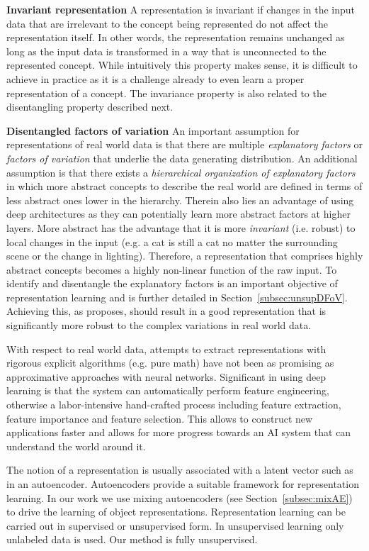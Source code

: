 \documentclass[12pt,a4paper]{article}
\begin{document}
\textbf{Invariant representation}
A representation is invariant if changes in the input data that are irrelevant to the concept being represented do not affect the representation itself. In other words, the representation remains unchanged as long as the input data is transformed in a way that is unconnected to the represented concept. While intuitively this property makes sense, it is difficult to achieve in practice as it is a challenge already to even learn a proper representation of a concept. The invariance property is also related to the disentangling property described next.

\textbf{Disentangled factors of variation} An important assumption for representations of real world data is that there are multiple \textit{explanatory factors} or \textit{factors of variation} that underlie the data generating distribution. An additional assumption is that there exists a \textit{hierarchical organization of explanatory factors} in which more abstract concepts to describe the real world are defined in terms of less abstract ones lower in the hierarchy. Therein also lies an advantage of using deep architectures as they can potentially learn more abstract factors at higher layers. More abstract has the advantage that it is more \textit{invariant} (i.e. robust) to local changes in the input (e.g. a cat is still a cat no matter the surrounding scene or the change in lighting). Therefore, a representation that comprises highly abstract concepts becomes a highly non-linear function of the raw input. To identify and disentangle the explanatory factors is an important objective of representation learning and is further detailed in Section~\ref{subsec:unsupDFoV}. Achieving this, as \cite{ReprLearning} proposes, should result in a good representation that is significantly more robust to the complex variations in real world data. 

With respect to real world data, attempts to extract representations with rigorous explicit algorithms (e.g. pure math) have not been as promising as approximative approaches with neural networks. Significant in using deep learning is that the system can automatically perform feature engineering, otherwise a labor-intensive hand-crafted process including feature extraction, feature importance and feature selection. This allows to construct new applications faster and allows for more progress towards an AI system that can understand the world around it.

The notion of a representation is usually associated with a latent vector such as in an autoencoder. Autoencoders provide a suitable framework for representation learning. In our work we use mixing autoencoders (see Section~\ref{subsec:mixAE}) to drive the learning of object representations. Representation learning can be carried out in supervised or unsupervised form. In unsupervised learning only unlabeled data is used. Our method is fully unsupervised.
\end{document}
